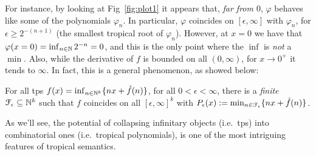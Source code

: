 For instance, by looking at Fig~\ref{fig:plot1} it appears that, \emph{far from $0$}, $\varphi$ behaves like some of the polynomials $\varphi_{n}$.
In particular, %
$\varphi$ coincides on $[\epsilon,\infty]$ with $\varphi_{n}$,
for $\epsilon \geq 2^{-(n+1)}$ (the smallest tropical root of $\varphi_{n}$).
However, at
%
 $x=0$ we have that $\varphi(x=0)=\inf_{n\in\mathbb{N}} 2^{-n}=0$, and this is the only point where the $\inf$ is \emph{not} a $\min$.
Also, while the derivative of $f$ is bounded on all $(0,\infty)$, for $x\to 0^+$ it tends to $\infty$.
In fact, this is a general phenomenon, as showed below:
% 

\begin{theorem}\label{theorem:fepsilon}
For all tps $f(x)=\inf_{n\in \mathbb N^{k}}\{n x+\hat{f}(n)\}$, for all $0<\epsilon<\infty$, there is a \emph{finite} $\mathcal{F}_\epsilon \subseteq \mathbb{N}^k$ such that 
% 
$f$ coincides on all $[\epsilon,\infty]^k$ with $P_\epsilon( x):=\min_{n\in \mathcal{F}_\epsilon}\{n x+\hat{f}(n)\}$.
\end{theorem}
As we'll see, the potential of collapsing infinitary objects (i.e.~tps) into combinatorial ones (i.e.~tropical polynomials), is one of the most intriguing features of tropical semantics. 


